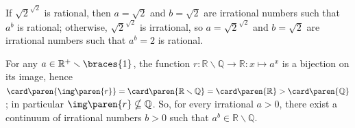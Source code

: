 If $\sqrt{2}^{\sqrt{2}}$ is rational,
then $a = \sqrt{2}$ and $b = \sqrt{2}$ are irrational numbers
such that $a^b$ is rational;
otherwise, $\sqrt{2}^{\sqrt{2}}$ is irrational,
so $a = \sqrt{2}^{\sqrt{2}}$ and $b = \sqrt{2}$ are irrational numbers
such that $a^b = 2$ is rational.

For any $a \in \mathbb{R}^{+} \smallsetminus \braces{1}$, the function
$r: \mathbb{R} \smallsetminus \mathbb{Q} \to \mathbb{R} : x \mapsto a^x$
is a bijection on its image, hence
$\card\paren{\img\paren{r}}
 = \card\paren{\mathbb{R} \smallsetminus \mathbb{Q}}
 = \card\paren{\mathbb{R}}
 > \card\paren{\mathbb{Q}}$;
in particular $\img\paren{r} \nsubseteq \mathbb{Q}$.
So, for every irrational $a > 0$,
there exist a continuum of irrational numbers $b > 0$
such that $a^b \in \mathbb{R} \smallsetminus \mathbb{Q}$.
